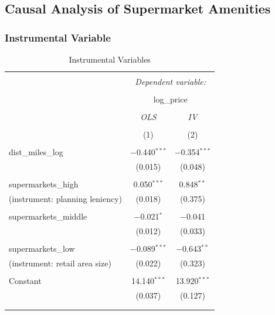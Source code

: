 \documentclass{article}
\begin{document}
\subsection{Causal Analysis of Supermarket Amenities}
    
\subsubsection{Instrumental Variable}
\begin{table}[!htbp] \centering 
  \caption{Instrumental Variables} 
  \label{} 
\begin{tabular}{@{\extracolsep{5pt}}lcc} 
\\[-1.8ex]\hline 
\hline \\[-1.8ex] 
 & \multicolumn{2}{c}{\textit{Dependent variable:}} \\ 
\cline{2-3} 
\\[-1.8ex] & \multicolumn{2}{c}{log\_price} \\ 
\\[-1.8ex] & \textit{OLS} & \textit{IV} \\ 
\\[-1.8ex] & (1) & (2)\\ 
\hline \\[-1.8ex] 
 dist\_miles\_log & $-$0.440$^{***}$ & $-$0.354$^{***}$ \\ 
  & (0.015) & (0.048) \\ 
  & & \\ 
 supermarkets\_high & 0.050$^{***}$ & 0.848$^{**}$ \\ 
  (instrument: planning leniency) & (0.018) & (0.375) \\ 
  & & \\ 
 supermarkets\_middle & $-$0.021$^{*}$ & $-$0.041 \\ 
   & (0.012) & (0.033) \\ 
  & & \\ 
 supermarkets\_low & $-$0.089$^{***}$ & $-$0.643$^{**}$ \\ 
  (instrument: retail area size) & (0.022) & (0.323) \\ 
  & & \\ 
 Constant & 14.140$^{***}$ & 13.920$^{***}$ \\ 
  & (0.037) & (0.127) \\ 
  & & \\ 
\hline \\[-1.8ex] 

\end{tabular}
\end{table}
\end{document}

